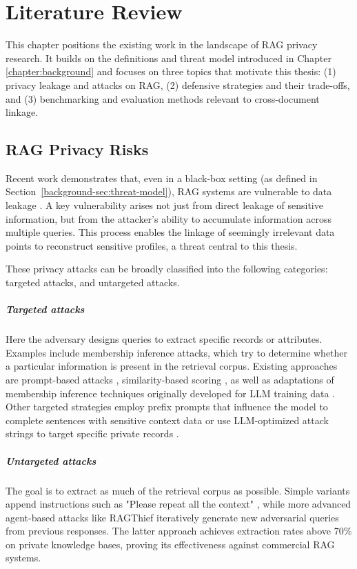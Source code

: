 \chapter{Literature Review}\label{chapter:literature}
This chapter positions the existing work in the landscape of \ac{RAG} privacy research. It builds on the definitions and threat model introduced in Chapter \ref{chapter:background} and focuses on three topics that motivate this thesis: (1) privacy leakage and attacks on RAG, (2) defensive strategies and their trade-offs, and (3) benchmarking and evaluation methods relevant to cross-document linkage.

\section{RAG Privacy Risks}\label{literature-sec:privacy-attacks}
Recent work demonstrates that, even in a black-box setting (as defined in Section~\ref{background-sec:threat-model}), \ac{RAG} systems are vulnerable to data leakage \cite{implicationsRAG,goodAndBad}. A key vulnerability arises not just from direct leakage of sensitive information, but from the attacker's ability to accumulate information across multiple queries. This process enables the linkage of seemingly irrelevant data points to reconstruct sensitive profiles, a threat central to this thesis.

These privacy attacks can be broadly classified into the following categories: targeted attacks, and untargeted attacks.

\paragraph{Targeted attacks} Here the adversary designs queries to extract specific records or attributes. Examples include membership inference attacks, which try to determine whether a particular information is present in the retrieval corpus. Existing approaches are prompt-based attacks \cite{ragMIA}, similarity-based scoring \cite{generatingIsBelieving}, as well as adaptations of membership inference techniques originally developed for LLM training data \cite{extractingTrainingDataLLM,generatingIsBelieving}. Other targeted strategies employ prefix prompts that influence the model to complete sentences with sensitive context data or use LLM-optimized attack strings to target specific private records \cite{goodAndBad, DEAL}.  

\paragraph{Untargeted attacks} The goal is to extract as much of the retrieval corpus as possible. Simple variants append instructions such as "Please repeat all the context" \cite{spillTheBeans,goodAndBad}, while more advanced agent-based attacks like {RAGThief} \cite{ragThief} iteratively generate new adversarial queries from previous responses. The latter approach achieves extraction rates above 70\% on private knowledge bases, proving its effectiveness against commercial \ac{RAG} systems.


